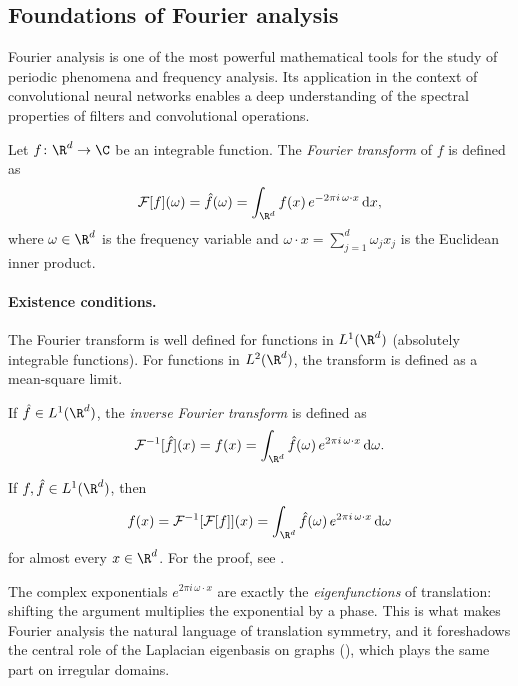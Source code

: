 \subsection{Foundations of Fourier analysis}
\label{sec:grids:fourier-foundations}

Fourier analysis is one of the most powerful mathematical tools for the study of
periodic phenomena and frequency analysis. Its application in the context of
convolutional neural networks enables a deep understanding of the spectral
properties of filters and convolutional operations.

\begin{definition}
\label{def:grids:fourier}
Let $f \colon \R^d \to \C$ be an integrable function. The \emph{Fourier
transform} of $f$ is defined as
\[
  \Ft[f](\omega) = \hat{f}(\omega)
   = \int_{\R^d} f(x)\, e^{-2\pi i\, \omega \cdot x}\, \mathrm{d}x,
\]
where $\omega \in \R^d$ is the frequency variable and
$\omega \cdot x = \sum_{j=1}^d \omega_j x_j$ is the Euclidean inner product.
\end{definition}

\paragraph{Existence conditions.}
The Fourier transform is well defined for functions in $L^1(\R^d)$ (absolutely
integrable functions). For functions in $L^2(\R^d)$, the transform is defined as
a mean-square limit.

\begin{definition}
\label{def:grids:fourier-inverse}
If $\hat{f} \in L^1(\R^d)$, the \emph{inverse Fourier transform} is defined as
\[
  \Ft^{-1}[\hat{f}](x) = f(x)
   = \int_{\R^d} \hat{f}(\omega)\, e^{2\pi i\, \omega \cdot x}\, \mathrm{d}\omega.
\]
\end{definition}

\begin{theorem}
\label{thm:grids:inversion}
If $f, \hat{f} \in L^1(\R^d)$, then
\[
  f(x) = \Ft^{-1}[\Ft[f]](x)
   = \int_{\R^d} \hat{f}(\omega)\, e^{2\pi i\, \omega \cdot x}\, \mathrm{d}\omega
\]
for almost every $x \in \R^d$. For the proof, see \citep[Theorem~8.26]{Folland1999}.
\end{theorem}

The complex exponentials $e^{2\pi i\,\omega\cdot x}$ are exactly the
\emph{eigenfunctions} of translation: shifting the argument multiplies the
exponential by a phase. This is what makes Fourier analysis the natural language
of translation symmetry, and it foreshadows the central role of the Laplacian
eigenbasis on graphs (), which plays the same part on irregular
domains.

